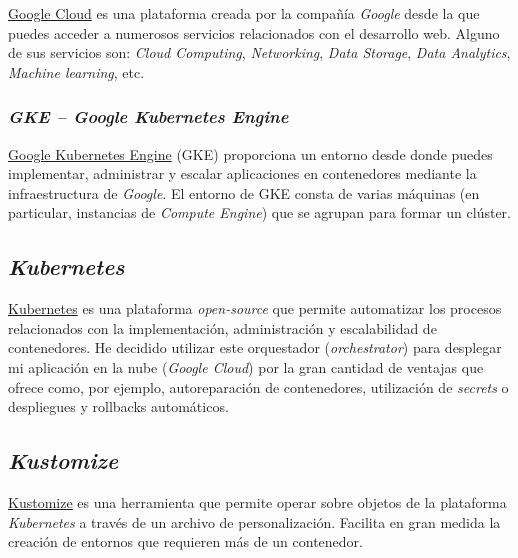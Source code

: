 \href{https://cloud.google.com/}{Google Cloud} es una plataforma creada
por la compañía \emph{Google} desde la que puedes acceder a numerosos
servicios relacionados con el desarrollo web. Alguno de sus servicios
son: \emph{Cloud Computing}, \emph{Networking}, \emph{Data Storage},
\emph{Data Analytics}, \emph{Machine learning}, etc.

\subsubsection{\emph{GKE -- Google Kubernetes Engine}}

\href{https://cloud.google.com/kubernetes-engine}{Google Kubernetes
Engine} (GKE) proporciona un entorno desde donde puedes implementar,
administrar y escalar aplicaciones en contenedores mediante la
infraestructura de \emph{Google}. El entorno de GKE consta de varias
máquinas (en particular, instancias de \emph{Compute Engine}) que se
agrupan para formar un clúster.

\subsection{\emph{Kubernetes}}

\href{https://kubernetes.io/es/}{Kubernetes} es una plataforma
\emph{open-source} que permite automatizar los procesos relacionados con
la implementación, administración y escalabilidad de contenedores. He
decidido utilizar este orquestador (\emph{orchestrator}) para desplegar
mi aplicación en la nube (\emph{Google Cloud}) por la gran cantidad de
ventajas que ofrece como, por ejemplo, autoreparación de contenedores,
utilización de \emph{secrets} o despliegues y rollbacks automáticos.

\subsection{\emph{Kustomize}}

\href{https://github.com/kubernetes-sigs/kustomize}{Kustomize} es una
herramienta que permite operar sobre objetos de la plataforma
\emph{Kubernetes} a través de un archivo de personalización. Facilita en gran medida
la creación de entornos que requieren más de un contenedor.